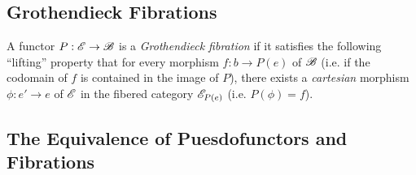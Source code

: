 \documentclass[12pt]{article}
\theoremstyle{definition}
\theoremstyle{remark}
\begin{document}
\subsection{Grothendieck Fibrations}

A functor $P : \mathscr{E} \to \mathscr{B}$ is a \textit{Grothendieck fibration} if it satisfies the following ``lifting'' property that for every morphism $f : b \to P(e)$ of $\mathscr{B}$ (i.e. if the codomain of $f$ is contained in the image of $P$), there exists a \textit{cartesian} morphism $\phi : e' \to e$ of $\mathscr{E}$ in the fibered category $\mathscr{E}_{P(e)}$ (i.e. $P(\phi) = f$).

\subsection{The Equivalence of Puesdofunctors and Fibrations}
\end{document}

